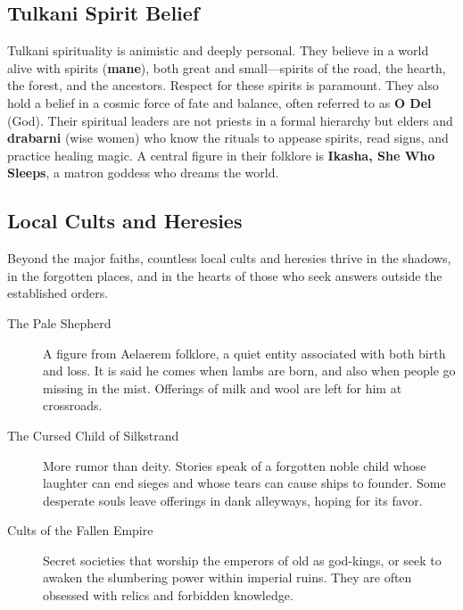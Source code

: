 \subsection*{Tulkani Spirit Belief}

Tulkani spirituality is animistic and deeply personal. They believe in a world alive with spirits (\textbf{mane}), both great and small—spirits of the road, the hearth, the forest, and the ancestors. Respect for these spirits is paramount. They also hold a belief in a cosmic force of fate and balance, often referred to as \textbf{O Del} (God). Their spiritual leaders are not priests in a formal hierarchy but elders and \textbf{drabarni} (wise women) who know the rituals to appease spirits, read signs, and practice healing magic. A central figure in their folklore is \textbf{Ikasha, She Who Sleeps}, a matron goddess who dreams the world.

\subsection*{Local Cults and Heresies}

Beyond the major faiths, countless local cults and heresies thrive in the shadows, in the forgotten places, and in the hearts of those who seek answers outside the established orders.

\begin{tcolorbox}[title=Whispers of Faith, colback=orange!5!white, colframe=orange!75!black, fonttitle=\bfseries]
\begin{description}
    \item[The Pale Shepherd] A figure from Aelaerem folklore, a quiet entity associated with both birth and loss. It is said he comes when lambs are born, and also when people go missing in the mist. Offerings of milk and wool are left for him at crossroads.
    \item[The Cursed Child of Silkstrand] More rumor than deity. Stories speak of a forgotten noble child whose laughter can end sieges and whose tears can cause ships to founder. Some desperate souls leave offerings in dank alleyways, hoping for its favor.
    \item[Cults of the Fallen Empire] Secret societies that worship the emperors of old as god-kings, or seek to awaken the slumbering power within imperial ruins. They are often obsessed with relics and forbidden knowledge.
\end{description}
\end{tcolorbox}

